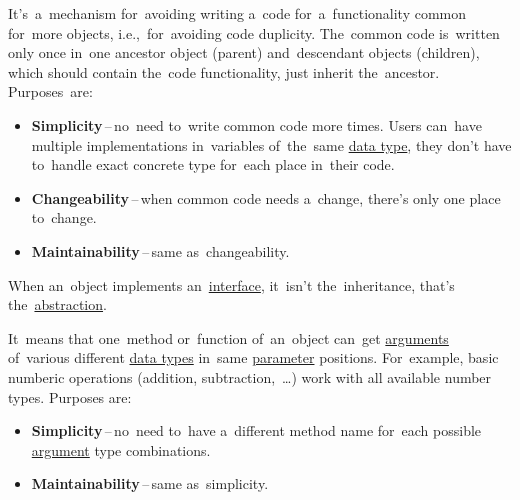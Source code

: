 \label{inheritance}
It's~a~mechanism for~avoiding writing a~code for~a~functionality common for~more objects, i.e.,~for~avoiding code duplicity. The~common code is~written only once in~one ancestor object (parent) and~descendant objects (children), which should contain the~code functionality, just inherit the~ancestor. Purposes~are:
\begin{itemize}
    \item \textbf{Simplicity}\,--\,no~need to~write common code more times. Users can~have multiple implementations in~variables of~the~same \hyperref[datatypes]{data type}, they don't have to~handle exact concrete type for~each place in~their code.
    \item \textbf{Changeability}\,--\,when common code needs a~change, there's only one place to~change.
    \item \textbf{Maintainability}\,--\,same as~changeability.
\end{itemize}

\warning When an~object implements an~\hyperref[javainterface]{interface}, it~isn't the~inheritance, that's the~\hyperref[abstraction]{abstraction}.

\label{polymorphism}
It~means that one~method or~function of~an~object can~get \hyperref[parameterargument]{arguments} of~various different \hyperref[datatypes]{data types} in~same \hyperref[parameterargument]{parameter} positions. For~example, basic numberic operations (addition, subtraction,~\dots) work with all available number types. Purposes are:
\begin{itemize}
    \item \textbf{Simplicity}\,--\,no~need to~have a~different method name for~each possible \hyperref[parameterargument]{argument} type combinations.
    \item \textbf{Maintainability}\,--\,same as~simplicity.
\end{itemize}

